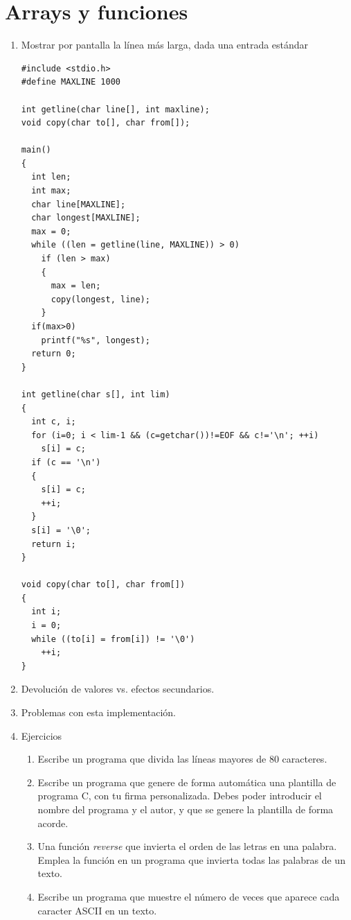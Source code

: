 \documentclass[a4paper,oneside]{article}
\begin{document}
\newpage
\section{Arrays y funciones}
  \begin{enumerate}
  \item Mostrar por pantalla la línea más larga, dada una entrada estándar

    \begin{verbatim}
#include <stdio.h>
#define MAXLINE 1000

int getline(char line[], int maxline);
void copy(char to[], char from[]);

main()
{
  int len;
  int max;
  char line[MAXLINE];
  char longest[MAXLINE];
  max = 0;
  while ((len = getline(line, MAXLINE)) > 0)
    if (len > max)
    {
      max = len;
      copy(longest, line);
    }
  if(max>0)
    printf("%s", longest);
  return 0;
}

int getline(char s[], int lim)
{
  int c, i;
  for (i=0; i < lim-1 && (c=getchar())!=EOF && c!='\n'; ++i)
    s[i] = c;
  if (c == '\n')
  {
    s[i] = c;
    ++i;
  }
  s[i] = '\0';
  return i;
}

void copy(char to[], char from[])
{
  int i;
  i = 0;
  while ((to[i] = from[i]) != '\0')
    ++i;
}
    \end{verbatim}
  \item Devolución de valores vs. efectos secundarios.
  \item Problemas con esta implementación.
  \item{Ejercicios}
    \begin{enumerate}
    \item Escribe un programa que divida las líneas mayores de 80 caracteres.
    \item Escribe un programa que genere de forma automática una plantilla de programa C, con tu firma personalizada. Debes poder introducir el nombre del programa y el autor, y que se genere la plantilla de forma acorde.
    \item Una función \textit{reverse} que invierta el orden de las letras en una palabra. Emplea la función en un programa que invierta todas las palabras de un texto.
    \item Escribe un programa que muestre el número de veces que aparece cada caracter ASCII en un texto.
    \end{enumerate}
  \end{enumerate}
\end{document}
